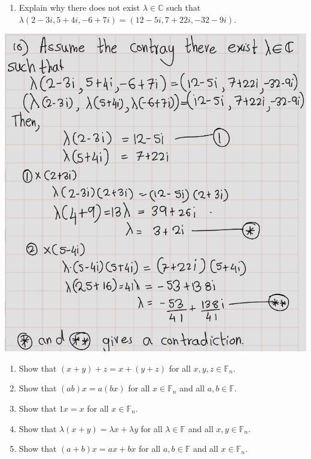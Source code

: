 \documentclass[
]{book}
\providecommand{\tightlist}{%
  \setlength{\itemsep}{0pt}\setlength{\parskip}{0pt}}
\theoremstyle{definition}
\theoremstyle{definition}
\theoremstyle{definition}
\theoremstyle{definition}
\theoremstyle{remark}
\begin{document}
\begin{enumerate}
\def\labelenumi{\arabic{enumi}.}
\setcounter{enumi}{9}
\tightlist
\item
  Explain why there does not exist \(\lambda \in \mathbb{C}\) such that \(\lambda(2 - 3i, 5 + 4i, -6 + 7i) = (12 - 5i, 7 + 22i, -32 - 9i)\).
\end{enumerate}

\includegraphics{fig/Ex1A/Ex10.png}

\begin{enumerate}
\def\labelenumi{\arabic{enumi}.}
\setcounter{enumi}{10}
\item
  Show that \((x + y) + z = x + (y + z)\) for all \(x, y, z \in \mathbb{F}_n\).
\item
  Show that \((ab)x = a(bx)\) for all \(x \in \mathbb{F}_n\) and all \(a, b \in \mathbb{F}\).
\item
  Show that \(1x = x\) for all \(x \in \mathbb{F}_n\).
\item
  Show that \(\lambda(x + y) = \lambda x + \lambda y\) for all \(\lambda \in \mathbb{F}\) and all \(x, y \in \mathbb{F}_n\).
\item
  Show that \((a + b)x = ax + bx\) for all \(a, b \in \mathbb{F}\) and all \(x \in \mathbb{F}_n\).
\end{enumerate}
\end{document}
